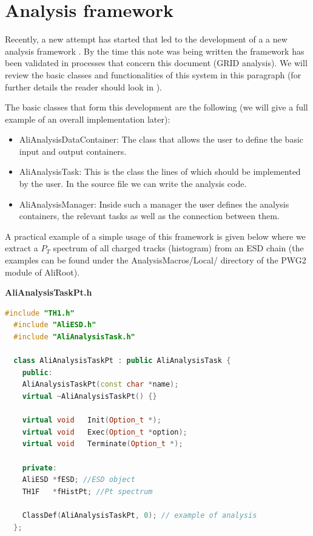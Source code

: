 \section{Analysis framework}
\label{Note:ANALYSIS}

Recently, a new attempt has started that led to the development of a a new analysis framework \cite{Note:RefAnalysisFramework}. By the time this note was being written the framework has been validated in processes that concern this document (GRID analysis). We will review the basic classes and functionalities of this system in this paragraph (for further details the reader should look in \cite{Note:RefAnalysisFramework,Note:RefAlienTutorial}).

The basic classes that form this development are the following (we will give a full example of an overall implementation later):

\begin{itemize}
\item {\ttfamily AliAnalysisDataContainer:} The class that allows the user to define the basic input and output containers.
\item {\ttfamily AliAnalysisTask:} This is the class the lines of which should be implemented by the user. In the source file we can write the analysis code. 
\item {\ttfamily AliAnalysisManager:} Inside such a manager the user defines the analysis containers, the relevant tasks as well as the connection between them.
\end{itemize}

A practical example of a simple usage of this framework is given below where we extract a $P_{T}$ spectrum of all charged tracks (histogram) from an ESD chain (the examples can be found under the AnalysisMacros/Local/ directory of the PWG2 module of AliRoot).

\vspace{0.5 cm}
\textbf{AliAnalysisTaskPt.h}
\begin{lstlisting}[language=C++]
  #include "TH1.h"
  #include "AliESD.h"
  #include "AliAnalysisTask.h"

  class AliAnalysisTaskPt : public AliAnalysisTask {
    public:
    AliAnalysisTaskPt(const char *name);
    virtual ~AliAnalysisTaskPt() {}
    
    virtual void   Init(Option_t *);
    virtual void   Exec(Option_t *option);
    virtual void   Terminate(Option_t *);
    
    private:
    AliESD *fESD; //ESD object
    TH1F   *fHistPt; //Pt spectrum
    
    ClassDef(AliAnalysisTaskPt, 0); // example of analysis
  };
\end{lstlisting}

